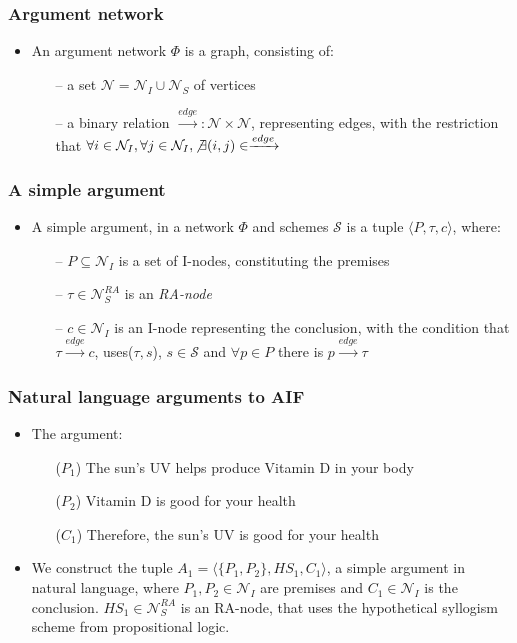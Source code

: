 \documentclass{beamer}
\begin{document}
\begin{frame}
\frametitle{Argument network}
\begin{itemize}
\item An argument network $\Phi$ is a graph, consisting of: \pause
  \begin{itemize}
  \item[--] a set $\mathcal{N} = \mathcal{N}_I \cup \mathcal{N}_S$ of vertices \pause
  \item[--] a binary relation $\xrightarrow{edge}:\mathcal{N}\times\mathcal{N}$, representing edges, with the restriction that $\forall i \in \mathcal{N}_I, \forall j \in \mathcal{N}_I, \not\exists (i,j)\in\xrightarrow{edge}$
  \end{itemize}
\centering
\end{itemize}
\end{frame}

\begin{frame}
\frametitle{A simple argument}
\begin{itemize}
\item A simple argument, in a network $\Phi$ and schemes $\mathcal{S}$ is a tuple $\langle P, \tau, c \rangle$, where: \pause
  \begin{itemize}
  \item[--] $P \subseteq \mathcal{N}_I$ is a set of I-nodes, constituting the premises \pause
  \item[--] $\tau \in \mathcal{N}_S^{RA}$ is an \emph{RA-node} \pause
  \item[--] $c \in \mathcal{N}_I$ is an I-node representing the conclusion, with the condition that $\tau \xrightarrow{edge} c$, uses($\tau, s$), $s \in \mathcal{S}$ and $\forall p \in P$ there is $p \xrightarrow{edge} \tau$
  \end{itemize}
\end{itemize}
\end{frame}


\begin{frame}
\frametitle{Natural language arguments to AIF}
\begin{itemize}
\item The argument: \pause
  \begin{itemize}
  \item[($P_1$)] The sun's UV helps produce Vitamin D in your body \pause
  \item[($P_2$)] Vitamin D is good for your health \pause
  \item[($C_1$)] Therefore, the sun's UV is good for your health \pause
  \end{itemize}
\item We construct the tuple $A_1 = \langle \lbrace P_1, P_2 \rbrace, HS_1, C_1\rangle$, a simple argument in natural language, where $P_1, P_2 \in \mathcal{N}_I$ are premises and $C_1 \in \mathcal{N}_I$ is the conclusion. $HS_1 \in \mathcal{N}_S^{RA}$ is an RA-node, that uses the hypothetical syllogism scheme from propositional logic.
\end{itemize}
\end{frame}
\end{document}
